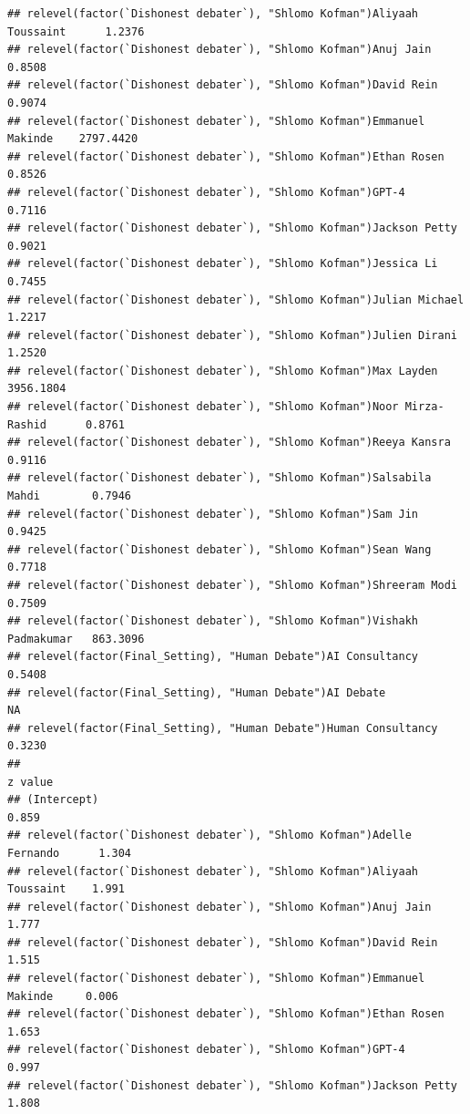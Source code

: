 \documentclass[
]{article}
\begin{document}
\begin{verbatim}
## relevel(factor(`Dishonest debater`), "Shlomo Kofman")Aliyaah Toussaint      1.2376
## relevel(factor(`Dishonest debater`), "Shlomo Kofman")Anuj Jain              0.8508
## relevel(factor(`Dishonest debater`), "Shlomo Kofman")David Rein             0.9074
## relevel(factor(`Dishonest debater`), "Shlomo Kofman")Emmanuel Makinde    2797.4420
## relevel(factor(`Dishonest debater`), "Shlomo Kofman")Ethan Rosen            0.8526
## relevel(factor(`Dishonest debater`), "Shlomo Kofman")GPT-4                  0.7116
## relevel(factor(`Dishonest debater`), "Shlomo Kofman")Jackson Petty          0.9021
## relevel(factor(`Dishonest debater`), "Shlomo Kofman")Jessica Li             0.7455
## relevel(factor(`Dishonest debater`), "Shlomo Kofman")Julian Michael         1.2217
## relevel(factor(`Dishonest debater`), "Shlomo Kofman")Julien Dirani          1.2520
## relevel(factor(`Dishonest debater`), "Shlomo Kofman")Max Layden          3956.1804
## relevel(factor(`Dishonest debater`), "Shlomo Kofman")Noor Mirza-Rashid      0.8761
## relevel(factor(`Dishonest debater`), "Shlomo Kofman")Reeya Kansra           0.9116
## relevel(factor(`Dishonest debater`), "Shlomo Kofman")Salsabila Mahdi        0.7946
## relevel(factor(`Dishonest debater`), "Shlomo Kofman")Sam Jin                0.9425
## relevel(factor(`Dishonest debater`), "Shlomo Kofman")Sean Wang              0.7718
## relevel(factor(`Dishonest debater`), "Shlomo Kofman")Shreeram Modi          0.7509
## relevel(factor(`Dishonest debater`), "Shlomo Kofman")Vishakh Padmakumar   863.3096
## relevel(factor(Final_Setting), "Human Debate")AI Consultancy                0.5408
## relevel(factor(Final_Setting), "Human Debate")AI Debate                         NA
## relevel(factor(Final_Setting), "Human Debate")Human Consultancy             0.3230
##                                                                         z value
## (Intercept)                                                               0.859
## relevel(factor(`Dishonest debater`), "Shlomo Kofman")Adelle Fernando      1.304
## relevel(factor(`Dishonest debater`), "Shlomo Kofman")Aliyaah Toussaint    1.991
## relevel(factor(`Dishonest debater`), "Shlomo Kofman")Anuj Jain            1.777
## relevel(factor(`Dishonest debater`), "Shlomo Kofman")David Rein           1.515
## relevel(factor(`Dishonest debater`), "Shlomo Kofman")Emmanuel Makinde     0.006
## relevel(factor(`Dishonest debater`), "Shlomo Kofman")Ethan Rosen          1.653
## relevel(factor(`Dishonest debater`), "Shlomo Kofman")GPT-4                0.997
## relevel(factor(`Dishonest debater`), "Shlomo Kofman")Jackson Petty        1.808

\end{verbatim}
\end{document}
